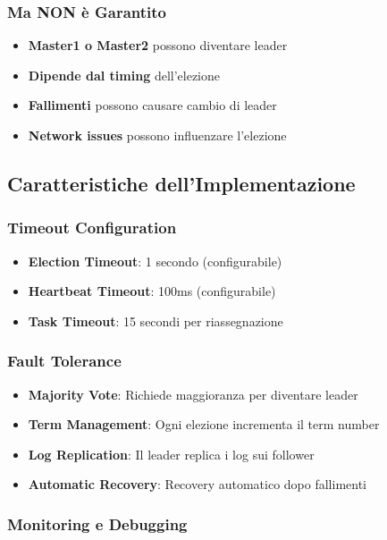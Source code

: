 \documentclass[12pt,a4paper]{article}
\begin{document}
\subsubsection{Ma NON è Garantito}

\begin{itemize}
\item \textbf{Master1 o Master2} possono diventare leader
\item \textbf{Dipende dal timing} dell'elezione
\item \textbf{Fallimenti} possono causare cambio di leader
\item \textbf{Network issues} possono influenzare l'elezione
\end{itemize}

\subsection{Caratteristiche dell'Implementazione}

\subsubsection{Timeout Configuration}

\begin{itemize}
\item \textbf{Election Timeout}: 1 secondo (configurabile)
\item \textbf{Heartbeat Timeout}: 100ms (configurabile)
\item \textbf{Task Timeout}: 15 secondi per riassegnazione
\end{itemize}

\subsubsection{Fault Tolerance}

\begin{itemize}
\item \textbf{Majority Vote}: Richiede maggioranza per diventare leader
\item \textbf{Term Management}: Ogni elezione incrementa il term number
\item \textbf{Log Replication}: Il leader replica i log sui follower
\item \textbf{Automatic Recovery}: Recovery automatico dopo fallimenti
\end{itemize}

\subsubsection{Monitoring e Debugging}
\end{document}
